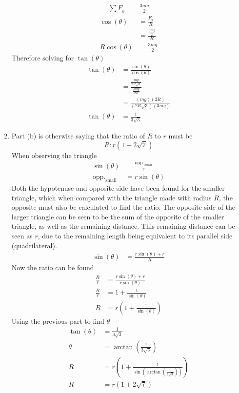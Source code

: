 \documentclass{article}
\begin{document}
\begin{enumerate}[label=\textbf{(\alph*)}]
\begin{align*}
			\sum F_y & = \frac{3mg}{2}
		\end{align*}
		\begin{align*}
			\cos(\theta) & = \frac{F_y}{R} \\
						 & = \frac{ \frac{3mg}{2} }{R} \\
			R\cos(\theta) & = \frac{3mg}{2}
		\end{align*}
		Therefore solving for $ \tan(\theta) $
		\begin{align*}
			\tan(\theta) & = \frac{\sin(\theta)}{\cos(\theta)} \\
						 & = \frac{ \frac{mg}{2R\sqrt{3}} }{ \frac{3mg}{2R} } \\
						 & = \frac{(mg)(2R)}{(2R\sqrt{3})(3mg)} \\
			\tan(\theta) & = \frac{1}{3\sqrt{3}}
		\end{align*}
	\item
		Part (b) is otherwise saying that the ratio of $ R $ to $ r $ must be
		$$ R : r(1 + 2\sqrt{7}) $$
		When observing the triangle
		\begin{align*}
			\sin(\theta) & = \frac{\text{opp.}_\text{small}}{r} \\
			\text{opp.}_\text{small} & = r\sin(\theta)
		\end{align*}
		Both the hypotenuse and opposite side have been found for the smaller triangle, which when compared with the triangle made with radius $ R $, the opposite must also be calculated to find the ratio. The opposite side of the larger triangle can be seen to be the sum of the opposite of the smaller triangle, as well as the remaining distance. This remaining distance can be seen as $ r $, due to the remaining length being equivalent to its parallel side (quadrilateral).
		\begin{align*}
			\sin(\theta) & = \frac{r\sin(\theta) + r}{R}
		\end{align*}
		Now the ratio can be found
		\begin{align*}
			\frac{R}{r} & = \frac{r\sin(\theta) + r}{r\sin(\theta)} \\
			\frac{R}{r} & = 1 + \frac{1}{\sin(\theta)} \\
			R & = r \left( 1 + \frac{1}{\sin(\theta)} \right)
		\end{align*}
		Using the previous part to find $ \theta $
		\begin{align*}
			\tan(\theta) & = \frac{1}{3\sqrt{3}} \\
			\theta & = \arctan \left( \frac{1}{3\sqrt{3}} \right) \\
			R & = r \left( 1 + \frac{1}{\sin \left( \arctan \left( \frac{1}{3\sqrt{3}} \right) \right) } \right) \\
			R & = r \left( 1 + 2\sqrt{7} \right)
		\end{align*}
\end{enumerate}
\end{document}
